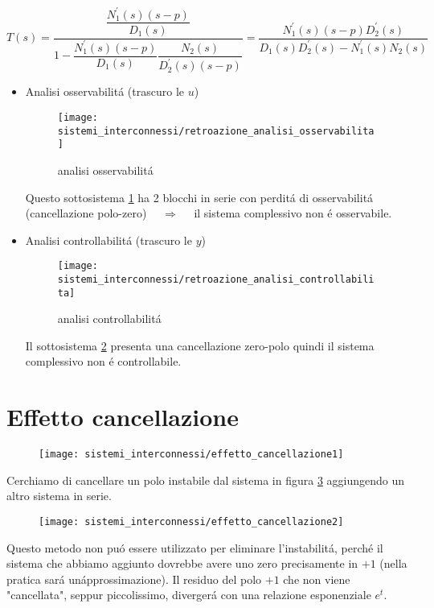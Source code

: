 \documentclass[../main.tex]{subfiles}
\begin{document}
		\[
			T(s) = \dfrac{\dfrac{N_1^{'}(s) (s-p)}{D_1(s)}}{1-\dfrac{N_1^{'}(s) (s-p)}{D_1(s)}\dfrac{N_2(s)}{D_2^{'}(s)(s-p)}} = \dfrac{N_1^{'}(s) (s-p) D_2^{'}(s)}{D_1(s)D_2^{'}(s) - N_1^{'}(s)N_2(s)}
		\]
		\begin{itemize}
			\item 
				Analisi osservabilit\'a (trascuro le $ u $)
				\begin{figure}[h!]
					\centering\texttt{[image: sistemi\_interconnessi/retroazione\_analisi\_osservabilita]}
					\caption{analisi osservabilit\'a}
					\label{fig:retroazione_analisi_osservabilita}
				\end{figure}
			
				Questo sottosistema \ref{fig:retroazione_analisi_osservabilita} ha 2 blocchi in serie con perdit\'a di osservabilit\'a (cancellazione polo-zero) $ \quad\Rightarrow\quad $ il sistema complessivo non \'e osservabile.
			\item 
				Analisi controllabilit\'a (trascuro le $ y $)
				\begin{figure}[h!]
					\centering\texttt{[image: sistemi\_interconnessi/retroazione\_analisi\_controllabilita]}
					\caption{analisi controllabilit\'a}
					\label{fig:retroazione_analisi_controllabilita}
				\end{figure}
				
				Il sottosistema \ref{fig:retroazione_analisi_controllabilita} presenta una cancellazione zero-polo quindi il sistema complessivo non \'e controllabile.
		\end{itemize}
	
	\section{Effetto cancellazione}
		\begin{figure}[h!]
			\centering\texttt{[image: sistemi\_interconnessi/effetto\_cancellazione1]}
			\label{fig:effetto_cancellazione1}
		\end{figure}
	
		Cerchiamo di cancellare un polo instabile dal sistema in figura \ref{fig:effetto_cancellazione1} aggiungendo un altro sistema in serie.
		\begin{figure}[h!]
			\centering\texttt{[image: sistemi\_interconnessi/effetto\_cancellazione2]}
			\label{fig:effetto_cancellazione2}
		\end{figure}
	
		Questo metodo non pu\'o essere utilizzato per eliminare l'instabilit\'a, perch\'e il sistema che abbiamo aggiunto dovrebbe avere uno zero precisamente in $ +1 $ (nella pratica sar\'a un\'approssimazione). Il residuo del polo $ +1 $ che non viene "cancellata", seppur piccolissimo, diverger\'a con una relazione esponenziale $ e^t $.
		
\end{document}
